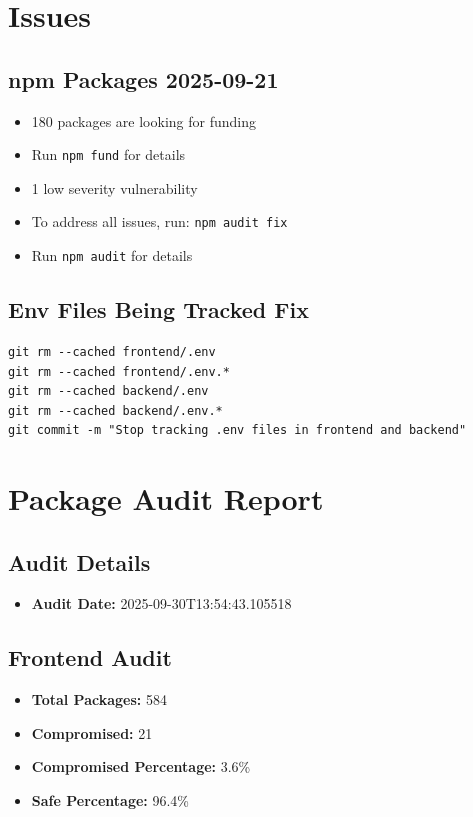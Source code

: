 \section{Issues}

\subsection{npm Packages 2025-09-21}
\begin{itemize}
    \item 180 packages are looking for funding
    \item Run \texttt{npm fund} for details
    \item 1 low severity vulnerability
    \item To address all issues, run: \texttt{npm audit fix}
    \item Run \texttt{npm audit} for details
\end{itemize}

\subsection{Env Files Being Tracked Fix}
\begin{verbatim}
git rm --cached frontend/.env
git rm --cached frontend/.env.*
git rm --cached backend/.env
git rm --cached backend/.env.*
git commit -m "Stop tracking .env files in frontend and backend"
\end{verbatim}

\section{Package Audit Report}

\subsection{Audit Details}
\begin{itemize}
    \item \textbf{Audit Date:} 2025-09-30T13:54:43.105518
\end{itemize}

\subsection{Frontend Audit}
\begin{itemize}
    \item \textbf{Total Packages:} 584
    \item \textbf{Compromised:} 21
    \item \textbf{Compromised Percentage:} 3.6\%
    \item \textbf{Safe Percentage:} 96.4\%
\end{itemize}

